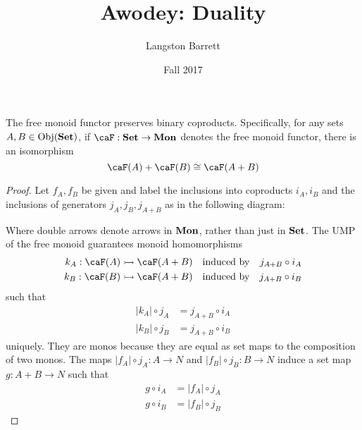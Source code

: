 \documentclass[a5paper]{article}
\begin{document}
\title{Awodey: Duality}
\author{Langston Barrett}
\date{Fall 2017}

\begin{theorem*}
	The free monoid functor preserves binary coproducts.
  Specifically, for any sets $A,B\in\operatorname{Obj}(\operatorname{\mathbf{Set}})$, if $\caF:\Set\to\Mon$ denotes
  the free monoid functor, there is an isomorphism
  \begin{equation*}
    \caF(A)+\caF(B)\cong \caF(A+B)
  \end{equation*}
\end{theorem*}
\begin{proof}
  Let $f_A,f_B$ be given and label the inclusions into coproducts $i_A,i_B$ and
  the inclusions of generators $j_A,j_B,j_{A+B}$ as in the following diagram:
  \begin{center}
  \end{center}
  Where double arrows denote arrows in $\operatorname{\mathbf{Mon}}$, rather than just in $\operatorname{\mathbf{Set}}$.
  The UMP of the free monoid guarantees monoid homomorphisms
  \begin{align*}
    k_A:\caF(A)\rightarrowtail \caF(A+B) &&\text{induced by}&&j_{A+B}\circ i_A \\
    k_B:\caF(B)\rightarrowtail \caF(A+B) &&\text{induced by}&&j_{A+B}\circ i_B
  \end{align*}
  such that
  \begin{align}
    |k_A| \circ j_A &= j_{A+B}\circ i_A \label{eq:ka} \\
    |k_B| \circ j_B &= j_{A+B}\circ i_B \label{eq:kb}
  \end{align}
  uniquely. They are monos because they are equal as set maps to the composition
  of two monos. The maps $|f_A|\circ j_A:A\to N$ and $|f_B|\circ j_B:B\to N$
  induce a set map $g:A+B\to N$ such that
  \begin{align}
    g\circ i_A &= |f_A|\circ j_A \label{eq:ga} \\
    g\circ i_B &= |f_B|\circ j_B \label{eq:gb}

\end{align}
\end{proof}
\end{document}
